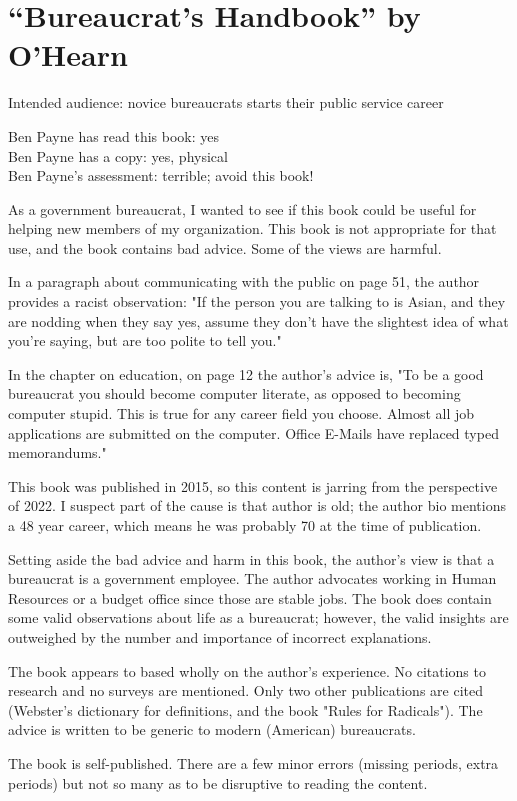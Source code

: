 \section{``Bureaucrat's Handbook'' by O'Hearn\label{review:ohearn_handbook}}

\cite{2015_OHearn}

Intended audience: novice bureaucrats starts their public service career

Ben Payne has read this book: yes\\
Ben Payne has a copy: yes, physical\\
Ben Payne's assessment: terrible; avoid this book!


As a government bureaucrat, I wanted to see if this book could be useful for helping new members of my organization. This book is not appropriate for that use, and the book contains bad advice. Some of the views are harmful. 



In a paragraph about communicating with the public on page 51, the author provides a racist observation: "If the person you are talking to is Asian, and they are nodding when they say yes, assume they don't have the slightest idea of what you're saying, but are too polite to tell you."



In the chapter on education, on page 12 the author's advice is, "To be a good bureaucrat you should become computer literate, as opposed to becoming computer stupid. This is true for any career field you choose. Almost all job applications are submitted on the computer. Office E-Mails have replaced typed memorandums." 



This book was published in 2015, so this content is jarring from the perspective of 2022. I suspect part of the cause is that author is old; the author bio mentions a 48 year career, which means he was probably 70 at the time of publication. 



Setting aside the bad advice and harm in this book, the author's view is that a bureaucrat is a government employee. The author advocates working in Human Resources or a budget office since those are stable jobs. The book does contain some valid observations about life as a bureaucrat; however, the valid insights are outweighed by the number and importance of incorrect explanations. 



The book appears to based wholly on the author's experience. No citations to research and no surveys are mentioned. Only two other publications are cited (Webster's dictionary for definitions, and the book "Rules for Radicals").  The advice is written to be generic to modern (American) bureaucrats. 



The book is self-published. There are a few minor errors (missing periods, extra periods) but not so many as to be disruptive to reading the content. 
